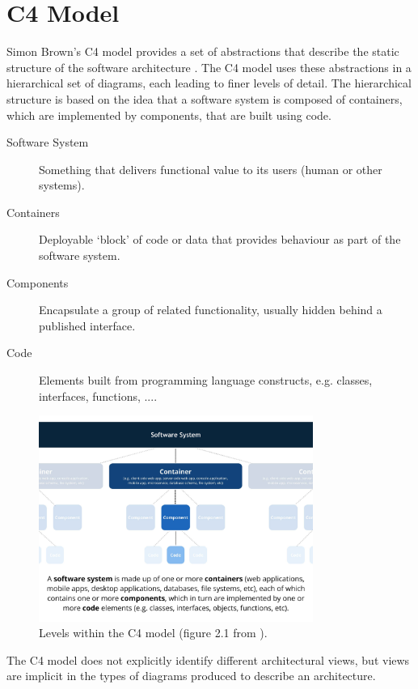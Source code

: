 \section{C4 Model}
Simon Brown's C4 model provides a set of abstractions that describe the static structure of the software architecture \cite{brown2022c4}.
The C4 model uses these abstractions in a hierarchical set of diagrams, each leading to finer levels of detail.
The hierarchical structure is based on the idea that a software system is composed of containers, which are implemented by components, that are built using code.
\begin{description}
    \item[Software System] Something that delivers functional value to its users (human or other systems).
    \item[Containers] Deployable `block' of code or data that provides behaviour as part of the software system.
    \item[Components] Encapsulate a group of related functionality, usually hidden behind a published interface.
    \item[Code] Elements built from programming language constructs, e.g. classes, interfaces, functions, ....
\end{description}

\begin{figure}[h]
    \centering
    \includegraphics[trim=0 8 0 5,clip,width=0.8\textwidth]{images/c4_terminology.jpg}
    \caption{Levels within the C4 model (figure 2.1 from \cite{brown2022c4}).}
    \label{fig:c4terms}
\end{figure}

\noindent
The C4 model does not explicitly identify different architectural views,
but views are implicit in the types of diagrams produced to describe an architecture.

